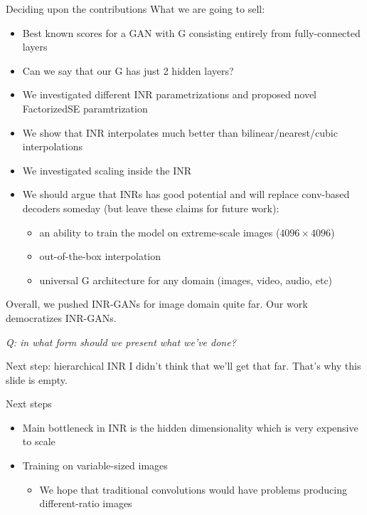 \documentclass[10pt]{beamer}
\begin{document}
\begin{frame}{Deciding upon the contributions}
What we are going to sell:
\begin{itemize}
    \item\pause Best known scores for a GAN with G consisting entirely from fully-connected layers
    \item\pause Can we say that our G has just 2 hidden layers?
    \item\pause We investigated different INR parametrizations and proposed novel FactorizedSE paramtrization
    \item\pause We show that INR interpolates much better than bilinear/nearest/cubic interpolations
    \item\pause We investigated scaling inside the INR
    \item\pause We should argue that INRs has good potential and will replace conv-based decoders someday (but leave these claims for future work):
    \begin{itemize}
        \item\pause an ability to train the model on extreme-scale images ($4096 \times 4096$)
        \item\pause out-of-the-box interpolation
        \item\pause universal G architecture for any domain (images, video, audio, etc)
    \end{itemize}
\end{itemize}

Overall, we pushed INR-GANs for image domain quite far.
Our work democratizes INR-GANs.

\textit{Q: in what form should we present what we've done?}
\end{frame}


\begin{frame}{Next step: hierarchical INR}
    I didn't think that we'll get that far. That's why this slide is empty.
\end{frame}


\begin{frame}{Next steps}
\begin{itemize}
    \item\pause Main bottleneck in INR is the hidden dimensionality which is very expensive to scale
    \item\pause Training on variable-sized images
    \begin{itemize}
        \item\pause We hope that traditional convolutions would have problems producing different-ratio images
    \end{itemize}
\end{itemize}
\end{frame}
\end{document}

